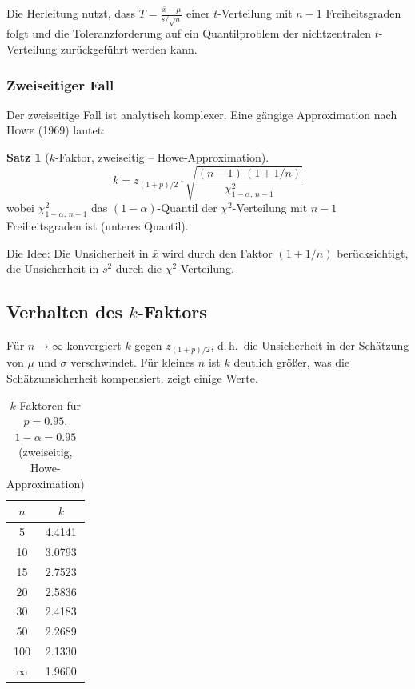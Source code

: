 \documentclass[10pt,a4paper,twocolumn]{article}
\theoremstyle{definition}
\newtheorem{satz}[definition]{Satz}
\newcommand{\xbar}{\bar{x}}
\begin{document}
Die Herleitung nutzt, dass
$T = \frac{\xbar - \mu}{s/\sqrt{n}}$ einer $t$-Verteilung mit
$n-1$ Freiheitsgraden folgt und die Toleranzforderung auf ein
Quantilproblem der nichtzentralen $t$-Verteilung zurückgeführt
werden kann.

\subsubsection{Zweiseitiger Fall}

Der zweiseitige Fall ist analytisch komplexer. Eine gängige
Approximation nach \textsc{Howe} (1969) lautet:

\begin{satz}[$k$-Faktor, zweiseitig -- Howe-Approximation]
\label{satz:k_two}
\begin{equation}
    k = z_{(1+p)/2} \cdot
    \sqrt{\frac{(n-1)\,(1 + 1/n)}{\chi^2_{1-\alpha,\,n-1}}}
    \label{eq:k_two}
\end{equation}
wobei $\chi^2_{1-\alpha,\,n-1}$ das $(1-\alpha)$-Quantil der
$\chi^2$-Verteilung mit $n-1$ Freiheitsgraden ist (unteres Quantil).
\end{satz}

Die Idee: Die Unsicherheit in $\xbar$ wird durch den Faktor
$(1 + 1/n)$ berücksichtigt, die Unsicherheit in $s^2$ durch die
$\chi^2$-Verteilung.

\subsection{Verhalten des $k$-Faktors}

Für $n \to \infty$ konvergiert $k$ gegen $z_{(1+p)/2}$, d.\,h.\
die Unsicherheit in der Schätzung von $\mu$ und $\sigma$ verschwindet.
Für kleines $n$ ist $k$ deutlich größer, was die
Schätzunsicherheit kompensiert.  zeigt einige
Werte.

\begin{table}[H]
\centering
\caption{$k$-Faktoren für $p=0.95$, $1-\alpha=0.95$ (zweiseitig,
Howe-Approximation)}
\label{tab:k_values}
\small
\begin{tabular}{@{}cc@{}}
\toprule
$n$ & $k$ \\
\midrule
5   & 4.4141 \\
10  & 3.0793 \\
15  & 2.7523 \\
20  & 2.5836 \\
30  & 2.4183 \\
50  & 2.2689 \\
100 & 2.1330 \\
$\infty$ & 1.9600 \\
\bottomrule
\end{tabular}
\end{table}
\end{document}
